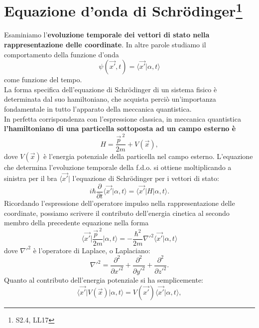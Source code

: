 \section[ Equazione d'onda di Schrödinger]{Equazione d'onda di Schr\"{o}dinger\footnote{S2.4, LL17}}
Esaminiamo l'\textbf{evoluzione temporale dei vettori di stato nella rappresentazione delle coordinate}. In altre parole studiamo il comportamento della funzione d'onda
\begin{equation}
\psi (\vec{x'}, t) = \langle \vec{x'}\vert \alpha, t \rangle
\end{equation}
come funzione del tempo.\\
La forma specifica dell'equazione di Schr\"{o}dinger di un sistema fisico è determinata dal suo hamiltoniano, che acquista perciò un'importanza fondamentale in tutto l'apparato della meccanica quantistica.\\
In perfetta corrispondenza con l'espressione classica, in meccanica quantistica \textbf{l'hamiltoniano di una particella sottoposta ad un campo esterno è}
\begin{equation}
H= \frac{\vec{p}^{\ 2}}{2m}+V(\vec{x}),
\label{eq:cap8_5}
\end{equation}
dove $V(\vec{x})$ è l'energia potenziale della particella nel campo esterno.		
L'equazione che determina l'evoluzione temporale della f.d.o. si ottiene moltiplicando a sinistra per il bra $\langle \vec{x'}\vert $ l'equazione di Schr\"{o}dinger per i vettori di stato:
\begin{equation}
i\hbar \frac{\partial}{\partial t} \langle \vec{x'}\vert \alpha , t \rangle = \langle \vec{x'}\vert H \vert \alpha , t \rangle.
\end{equation}
Ricordando l'espressione dell'operatore impulso nella rappresentazione delle coordinate, possiamo scrivere il contributo dell'energia cinetica al secondo membro della precedente equazione nella forma
\begin{equation}
\langle \vec{x'}\vert \frac{\vec{p}^{\ 2}}{2m} \vert \alpha , t \rangle = -\frac{\hbar^2}{2m}{{\nabla}'}^2\langle \vec{x'}\vert \alpha , t \rangle
\end{equation}
dove ${{\nabla}'}^2$ è l'operatore di Laplace, o Laplaciano:
\begin{equation}
{{\nabla}'}^2= \frac{\partial ^2}{\partial {x'} ^2}+\frac{\partial ^2}{\partial {y'} ^2}+\frac{\partial ^2}{\partial {z'} ^2}.
\end{equation}
Quanto al contributo dell'energia potenziale si ha semplicemente:
\begin{equation}
\langle \vec{x'}\vert V(\vec{x}) \vert \alpha , t \rangle = V(\vec{x'})\langle \vec{x'}  \vert \alpha , t \rangle ,
\end{equation}
